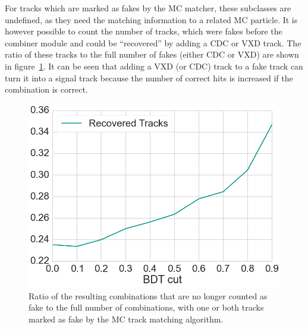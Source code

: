 For tracks which are marked as fakes by the MC matcher, these subclasses are undefined, as they need the matching information to a related MC particle. It is however possible to count the number of tracks, which were fakes before the combiner module and could be ``recovered'' by adding a CDC or VXD track. The ratio of these tracks to the full number of fakes (either CDC or VXD) are shown in figure~\ref{fig-vxd-cdc-recovered}. It can be seen that adding a VXD (or CDC) track to a fake track can turn it into a signal track because the number of correct hits is increased if the combination is correct. 

\begin{figure}
  \centering
  \includegraphics[width=0.7\linewidth]{figures/workflow/vxd_cdc_merger_recovered.png}
  \caption{Ratio of the resulting combinations that are no longer counted as fake to the full number of combinations, with one or both tracks marked as fake by the MC track matching algorithm.}
  \label{fig-vxd-cdc-recovered}
\end{figure}

